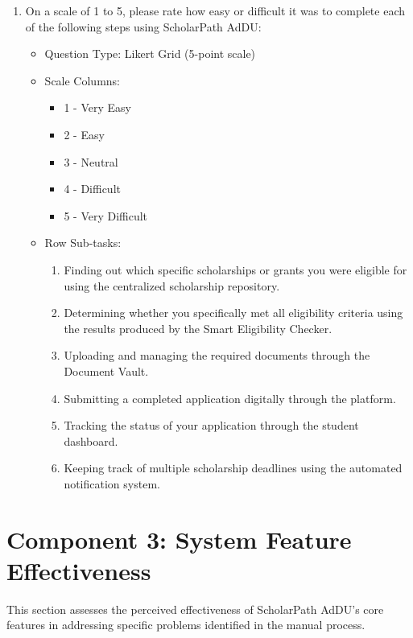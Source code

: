 \begin{enumerate}[resume=q, label={Question \arabic*:}, leftmargin=*, align=left]
  \item On a scale of 1 to 5, please rate how easy or difficult it was to complete each of the following steps using ScholarPath AdDU:
  \begin{itemize}[leftmargin=*]
    \item Question Type: Likert Grid (5-point scale)
    \item Scale Columns:
    \begin{itemize}[leftmargin=*]
      \item 1 - Very Easy
      \item 2 - Easy
      \item 3 - Neutral
      \item 4 - Difficult
      \item 5 - Very Difficult
    \end{itemize}
    \item Row Sub-tasks:
    \begin{enumerate}[label=\arabic*., leftmargin=*]
      \item Finding out which specific scholarships or grants you were eligible for using the centralized scholarship repository.
      \item Determining whether you specifically met all eligibility criteria using the results produced by the Smart Eligibility Checker.
      \item Uploading and managing the required documents through the Document Vault.
      \item Submitting a completed application digitally through the platform.
      \item Tracking the status of your application through the student dashboard.
      \item Keeping track of multiple scholarship deadlines using the automated notification system.
    \end{enumerate}
  \end{itemize}
\end{enumerate}

\section{Component 3: System Feature Effectiveness}

This section assesses the perceived effectiveness of ScholarPath AdDU's core features in addressing specific problems identified in the manual process.

